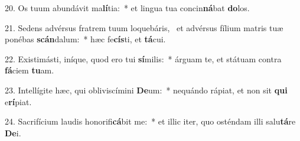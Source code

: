20. Os tuum abundávit ma\textbf{lí}tia:~*  et lingua tua concin\textbf{ná}bat \textbf{do}los.\

21. Sedens advérsus fratrem tuum loquebáris, \dag\  et advérsus fílium matris tuæ ponébas \textbf{scán}dalum:~*  hæc fe\textbf{cís}ti, et \textbf{tá}cui.\

22. Existimásti, iníque, quod ero tui \textbf{sí}milis:~*  árguam te, et státuam contra \textbf{fá}ciem \textbf{tu}am.\

23. Intellígite hæc, qui obliviscímini \textbf{De}um:~*  nequándo rápiat, et non sit \textbf{qui} e\textbf{rí}piat.\

24. Sacrifícium laudis honorifi\textbf{cá}bit me:~*  et illic iter, quo osténdam illi salu\textbf{tá}re \textbf{De}i.\

